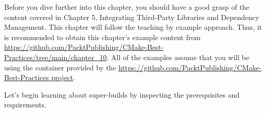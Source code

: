 Before you dive further into this chapter, you should have a good grasp of the content covered in Chapter 5, Integrating Third-Party Libraries and Dependency Management. This chapter will follow the teaching by example approach. Thus, it is recommended to obtain this chapter's example content from \url{https://github.com/PacktPublishing/CMake-Best-Practices/tree/main/chapter_10}. All of the examples assume that you will be using the container provided by the \url{https://github.com/PacktPublishing/CMake-Best-Practices project}.

Let's begin learning about super-builds by inspecting the prerequisites and requirements.